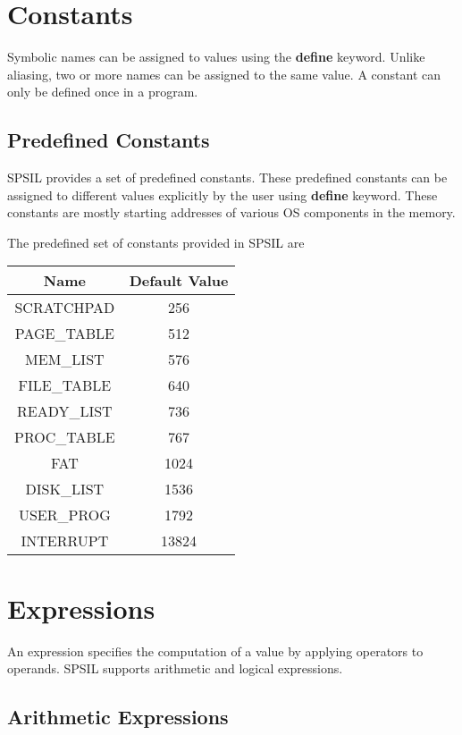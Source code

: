 \section{Constants}
Symbolic names can be assigned to values using the \textbf{define} keyword. Unlike aliasing, two or more names can be assigned to the same value. A constant can only be defined once in a program.
	
\subsection{Predefined Constants}
SPSIL provides a set of predefined constants. These predefined constants can be assigned to different values explicitly by the user using \textbf{define} keyword. These constants are mostly starting addresses of various OS components in the memory.

The predefined set of constants provided in SPSIL are \\
\begin{center}
\begin{tabular}{| c | c |}
\hline
\textbf{Name} & \textbf{Default Value} \\
\hline
SCRATCHPAD 	& 	256 \\
\hline
PAGE\_TABLE 	& 	512  \\
\hline
MEM\_LIST 	&	576 	\\
\hline
FILE\_TABLE 	& 	640		\\
\hline
READY\_LIST 	& 	736	\\
\hline
PROC\_TABLE 	& 	767 \\
\hline
FAT 		& 	1024    \\
\hline
DISK\_LIST 	& 	1536 	\\
\hline
USER\_PROG 	& 	1792	\\
\hline
INTERRUPT & 	13824	\\
\hline
\end{tabular}
\end{center}


\section{Expressions}
An expression specifies the computation of a value by applying operators to operands. SPSIL supports arithmetic and logical expressions.

\subsection{Arithmetic Expressions}

